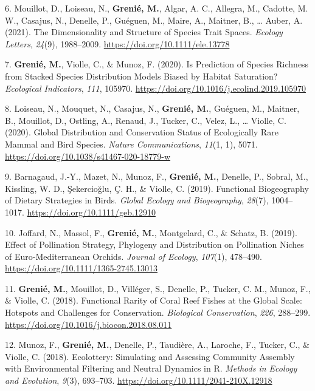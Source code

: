 \documentclass[10pt,a4paper,]{article}
\begin{document}
\leavevmode{}%
6. Mouillot, D., Loiseau, N., \textbf{Grenié, M.}, Algar, A. C.,
Allegra, M., Cadotte, M. W., Casajus, N., Denelle, P., Guéguen, M.,
Maire, A., Maitner, B., \ldots{} Auber, A. (2021). The Dimensionality
and Structure of Species Trait Spaces. \emph{Ecology Letters},
\emph{24}(9), 1988--2009. \url{https://doi.org/10.1111/ele.13778}

\leavevmode{}%
7. \textbf{Grenié, M.}, Violle, C., \& Munoz, F. (2020). Is Prediction
of Species Richness from Stacked Species Distribution Models Biased by
Habitat Saturation? \emph{Ecological Indicators}, \emph{111}, 105970.
\url{https://doi.org/10.1016/j.ecolind.2019.105970}

\leavevmode{}%
8. Loiseau, N., Mouquet, N., Casajus, N., \textbf{Grenié, M.}, Guéguen,
M., Maitner, B., Mouillot, D., Ostling, A., Renaud, J., Tucker, C.,
Velez, L., \ldots{} Violle, C. (2020). Global Distribution and
Conservation Status of Ecologically Rare Mammal and Bird Species.
\emph{Nature Communications}, \emph{11}(1, 1), 5071.
\url{https://doi.org/10.1038/s41467-020-18779-w}

\leavevmode{}%
9. Barnagaud, J.-Y., Mazet, N., Munoz, F., \textbf{Grenié, M.}, Denelle,
P., Sobral, M., Kissling, W. D., Şekercioğlu, Ç. H., \& Violle, C.
(2019). Functional Biogeography of Dietary Strategies in Birds.
\emph{Global Ecology and Biogeography}, \emph{28}(7), 1004--1017.
\url{https://doi.org/10.1111/geb.12910}

\leavevmode{}%
10. Joffard, N., Massol, F., \textbf{Grenié, M.}, Montgelard, C., \&
Schatz, B. (2019). Effect of Pollination Strategy, Phylogeny and
Distribution on Pollination Niches of Euro-Mediterranean Orchids.
\emph{Journal of Ecology}, \emph{107}(1), 478--490.
\url{https://doi.org/10.1111/1365-2745.13013}

\leavevmode{}%
11. \textbf{Grenié, M.}, Mouillot, D., Villéger, S., Denelle, P.,
Tucker, C. M., Munoz, F., \& Violle, C. (2018). Functional Rarity of
Coral Reef Fishes at the Global Scale: Hotspots and Challenges for
Conservation. \emph{Biological Conservation}, \emph{226}, 288--299.
\url{https://doi.org/10.1016/j.biocon.2018.08.011}

\leavevmode{}%
12. Munoz, F., \textbf{Grenié, M.}, Denelle, P., Taudière, A., Laroche,
F., Tucker, C., \& Violle, C. (2018). Ecolottery: Simulating and
Assessing Community Assembly with Environmental Filtering and Neutral
Dynamics in R. \emph{Methods in Ecology and Evolution}, \emph{9}(3),
693--703. \url{https://doi.org/10.1111/2041-210X.12918}
\end{document}

